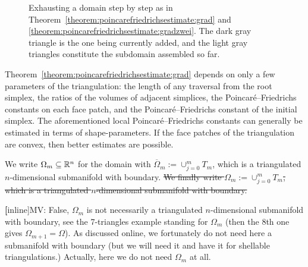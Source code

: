 \documentclass[10pt,a4paper]{article}
\newcommand\cye[1]{%
\protect\leavevmode
\begingroup
    \color{blue}%
    #1%
\endgroup
}
\newcommand{\todo}[1]{{\color{RedOrange}\textbf{#1}}}
\begin{document}
\begin{figure}[t]
\begin{center}
\end{center}
\caption{Exhausting a domain step by step as in Theorem~\ref{theorem:poincarefriedrichsestimate:grad} and \ref{theorem:poincarefriedrichsestimate:gradzwei}.
The dark gray triangle is the one being currently added, and the light gray triangles constitute the subdomain assembled so far.}
\label{figure:exhausting}
\end{figure}

\begin{remark}
    Theorem~\ref{theorem:poincarefriedrichsestimate:grad} depends on only a few parameters of the triangulation:
    the length of any traversal from the root simplex, the ratios of the volumes of adjacent simplices,
    the Poincar\'e--Friedrichs constants on each face patch, and the Poincar\'e--Friedrichs constant of the initial simplex. 
    The aforementioned local Poincar\'e--Friedrichs constants can generally be estimated in terms of shape-parameters. 
    If the face patches of the triangulation are convex, then better estimates are possible. 
\end{remark}

We write $\Omega_{m} \subseteq {\mathbb R}^{n}$ for the domain with $\overline\Omega_m := \cup_{j=0}^{m} T_m$, 
    which is a triangulated $n$-dimensional submanifold with boundary.
    \cye{\sout{We finally write $\Omega_m := \cup_{j=0}^{m} T_m$, which is a triangulated $n$-dimensional submanifold with boundary.}}
    \todo[inline]{MV: False, $\Omega_m$ is not necessarily a triangulated $n$-dimensional submanifold with boundary, see the 7-triangles example standing for $\Omega_m$ (then the 8th one gives $\Omega_{m+1} = \Omega$). As discussed online, we fortunately do not need here a submanifold with boundary (but we will need it and have it for shellable triangulations.) Actually, here we do not need $\Omega_m$ at all.}
\end{document}

